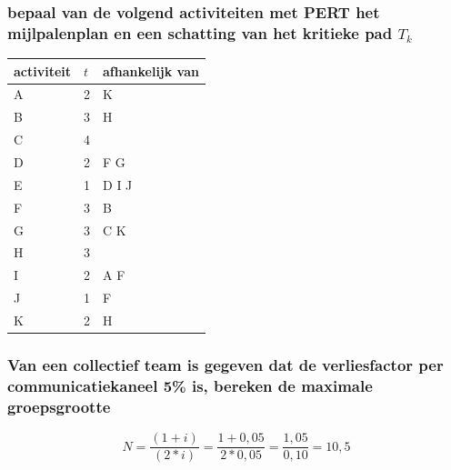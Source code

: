\documentclass[a4paper,titlepage]{artikel1}
\begin{document}
   \subsubsection[Opdracht 2]{bepaal van de volgend activiteiten met PERT het mijlpalenplan en een schatting van het kritieke pad $T_k$}
   \begin{center}
     \begin{tabular}{|l|l|l|}
     \hline
     activiteit & $t$ & afhankelijk van \\
     \hline
     A & 2 & K \\
     B & 3 & H \\
     C & 4 &\\
     D & 2 & F G \\
     E & 1 & D I J \\
     F & 3 & B \\
     G & 3 & C K \\
     H & 3 & \\
     I & 2 & A F \\
     J & 1 & F \\
     K & 2 & H \\
     \hline
     \end{tabular}
   \end{center}
   \subsubsection[Opdracht 3]{Van een collectief team is gegeven dat de verliesfactor per communicatiekaneel 5\% is, bereken de maximale groepsgrootte}
   \begin{displaymath}
     N=\frac{(1+i)}{(2*i)}=\frac{1+0,05}{2*0,05}=\frac{1,05}{0,10}=10,5
   \end{displaymath}
\end{document}
